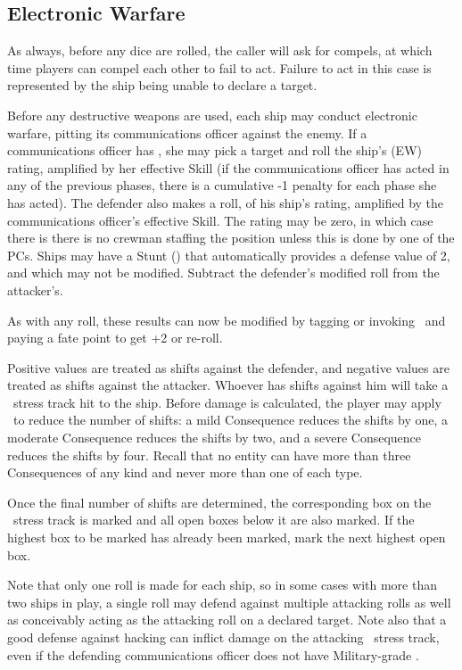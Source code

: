 \subsection{Electronic Warfare}\label{sec:Electronic Warfare}
\vfil
As always, before any dice are rolled, the caller will ask for compels, at which time players can compel each other to fail to act. Failure to act in this case is represented by the ship being unable to declare a target.

Before any destructive weapons are used, each ship may conduct electronic warfare, pitting its communications officer against the enemy. If a communications officer has , she may pick a target and roll the ship's  (EW) rating, amplified by her effective  Skill (if the communications officer has acted in any of the previous phases, there is a cumulative -1 penalty for each phase she has acted). The defender also makes a roll, of his ship's  rating, amplified by the communications officer's effective  Skill. The rating may be zero, in which case there is there is no crewman staffing the position unless this is done by one of the PCs. Ships may have a Stunt () that automatically provides a defense value of 2, and which may not be modified. Subtract the defender's modified roll from the attacker's.

As with any roll, these results can now be modified by tagging or invoking \Aspects\ and paying a fate point to get +2 or re-roll.

Positive values are treated as shifts against the defender, and
%
negative values are treated as shifts against the attacker.
%
Whoever has shifts against him will take a \Data\ stress track hit to the ship. Before damage is calculated, the player may apply \Consequences\ to reduce the number of shifts: a mild Consequence reduces the shifts by one, a moderate Consequence reduces the shifts by two, and a severe Consequence reduces the shifts by four. Recall that no entity can have more than three Consequences of any kind and never more than one of each type.


Once the final number of shifts are determined, the corresponding box on the \Data\ stress track is marked and all open boxes below it are also marked. If the highest box to be marked has already been marked, mark the next highest open box.

Note that only one roll is made for each ship, so in some cases with more than two ships in play, a single roll may defend against multiple attacking rolls as well as conceivably acting as the attacking roll on a declared target. Note also that a good defense against hacking can inflict damage on the attacking \Data\ stress track, even if the defending communications officer does not have Military-grade .

